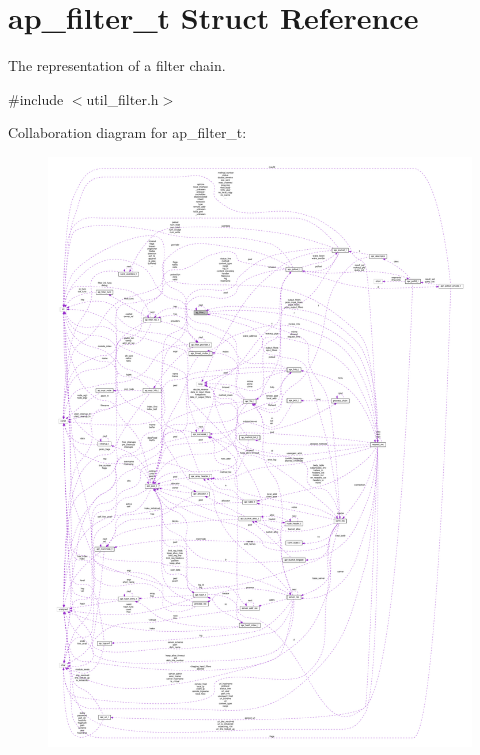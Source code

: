 \hypertarget{structap__filter__t}{}\section{ap\+\_\+filter\+\_\+t Struct Reference}
\label{structap__filter__t}


The representation of a filter chain.  




{\ttfamily \#include $<$util\+\_\+filter.\+h$>$}



Collaboration diagram for ap\+\_\+filter\+\_\+t\+:
\nopagebreak
\begin{figure}[H]
\begin{center}
\leavevmode
\includegraphics[width=350pt]{structap__filter__t__coll__graph}
\end{center}
\end{figure}
